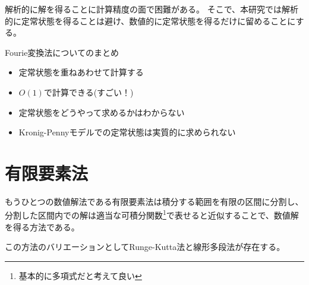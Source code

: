 \documentclass[autodetect-engine,dvipdfmx-if-dvi,ja=standard,a4paper,layout=v2]{bxjsreport}
\begin{document}
    解析的に解を得ることに計算精度の面で困難がある。
    そこで、本研究では解析的に定常状態を得ることは避け、数値的に定常状態を得るだけに留めることにする。
    \begin{itembox}[l]{Fourie変換法についてのまとめ}
      \begin{itemize}
        \item 定常状態を重ねあわせて計算する
        \item $O(1)$で計算できる(すごい！)
        \item 定常状態をどうやって求めるかはわからない
        \item Kronig-Pennyモデルでの定常状態は実質的に求められない
      \end{itemize}
    \end{itembox}
    \section{有限要素法}
    もうひとつの数値解法である有限要素法は積分する範囲を有限の区間に分割し、
    分割した区間内での解は適当な可積分関数\footnote{
      基本的に多項式だと考えて良い
    }で表せると近似することで、数値解を得る方法である。\par
    この方法のバリエーションとしてRunge-Kutta法と線形多段法が存在する。
\end{document}
